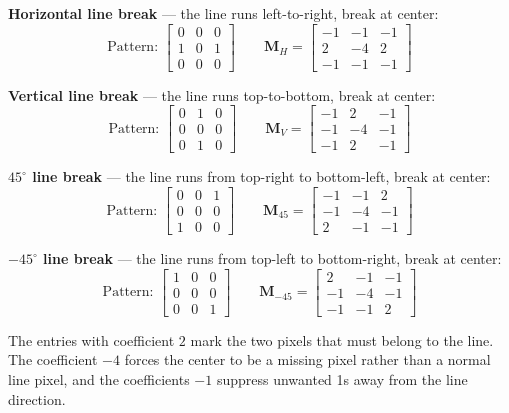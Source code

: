 \documentclass[12pt]{article}
\begin{document}
\begin{stepbox}

\textbf{Horizontal line break} --- the line runs left-to-right, break at center:
\[
\text{Pattern: }
\begin{bmatrix} 0 & 0 & 0 \\ 1 & 0 & 1 \\ 0 & 0 & 0 \end{bmatrix}
\qquad
\mathbf{M}_H =
\begin{bmatrix} -1 & -1 & -1 \\ 2 & -4 & 2 \\ -1 & -1 & -1 \end{bmatrix}
\]

\textbf{Vertical line break} --- the line runs top-to-bottom, break at center:
\[
\text{Pattern: }
\begin{bmatrix} 0 & 1 & 0 \\ 0 & 0 & 0 \\ 0 & 1 & 0 \end{bmatrix}
\qquad
\mathbf{M}_V =
\begin{bmatrix} -1 & 2 & -1 \\ -1 & -4 & -1 \\ -1 & 2 & -1 \end{bmatrix}
\]

\textbf{$45^\circ$ line break} --- the line runs from top-right to bottom-left, break at center:
\[
\text{Pattern: }
\begin{bmatrix} 0 & 0 & 1 \\ 0 & 0 & 0 \\ 1 & 0 & 0 \end{bmatrix}
\qquad
\mathbf{M}_{45} =
\begin{bmatrix} -1 & -1 & 2 \\ -1 & -4 & -1 \\ 2 & -1 & -1 \end{bmatrix}
\]

\textbf{$-45^\circ$ line break} --- the line runs from top-left to bottom-right, break at center:
\[
\text{Pattern: }
\begin{bmatrix} 1 & 0 & 0 \\ 0 & 0 & 0 \\ 0 & 0 & 1 \end{bmatrix}
\qquad
\mathbf{M}_{-45} =
\begin{bmatrix} 2 & -1 & -1 \\ -1 & -4 & -1 \\ -1 & -1 & 2 \end{bmatrix}
\]

The entries with coefficient $2$ mark the two pixels that must belong to the line. The coefficient $-4$ forces the center to be a missing pixel rather than a normal line pixel, and the coefficients $-1$ suppress unwanted 1s away from the line direction.
\end{stepbox}
\end{document}
